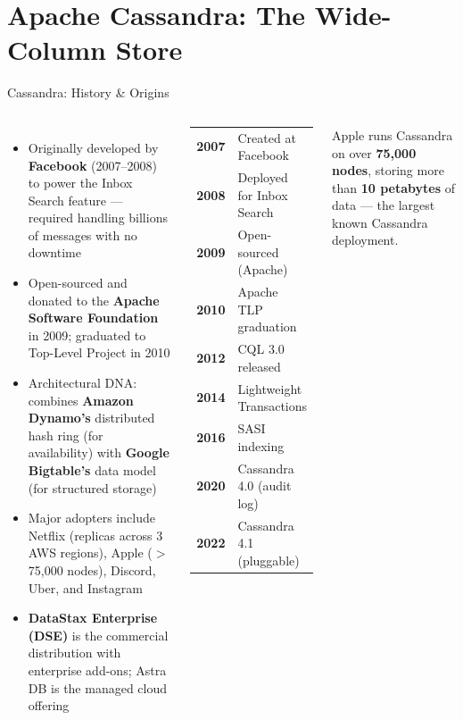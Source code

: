 \documentclass[aspectratio=169]{beamer}
\begin{document}
\section{Apache Cassandra: The Wide-Column Store}

\begin{frame}{Cassandra: History \& Origins}
  \begin{columns}[T]
      \begin{itemize}\small
        \item Originally developed by \textbf{Facebook} (2007--2008) to power the Inbox Search feature — required handling billions of messages with no downtime
        \item Open-sourced and donated to the \textbf{Apache Software Foundation} in 2009; graduated to Top-Level Project in 2010
        \item Architectural DNA: combines \textbf{Amazon Dynamo's} distributed hash ring (for availability) with \textbf{Google Bigtable's} data model (for structured storage)
        \item Major adopters include Netflix (replicas across 3 AWS regions), Apple ($>$75,000 nodes), Discord, Uber, and Instagram
        \item \textbf{DataStax Enterprise (DSE)} is the commercial distribution with enterprise add-ons; Astra DB is the managed cloud offering
      \end{itemize}
      \begin{tcolorbox}[cassbox, title=Key Milestones]
        \scriptsize
        \begin{tabular}{@{}rl@{}}
          \textbf{2007} & Created at Facebook \\
          \textbf{2008} & Deployed for Inbox Search \\
          \textbf{2009} & Open-sourced (Apache) \\
          \textbf{2010} & Apache TLP graduation \\
          \textbf{2012} & CQL 3.0 released \\
          \textbf{2014} & Lightweight Transactions \\
          \textbf{2016} & SASI indexing \\
          \textbf{2020} & Cassandra 4.0 (audit log) \\
          \textbf{2022} & Cassandra 4.1 (pluggable) \\
        \end{tabular}
      \end{tcolorbox}
      \vspace{0.2cm}
      \begin{tcolorbox}[deepdivebox, title=Scale Fact]
        \scriptsize
        Apple runs Cassandra on over \textbf{75,000 nodes}, storing more than \textbf{10 petabytes} of data — the largest known Cassandra deployment.
      \end{tcolorbox}
  \end{columns}
\end{frame}
\end{document}
